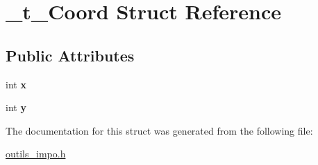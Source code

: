 \hypertarget{struct__t__Coord}{\section{\-\_\-t\-\_\-\-Coord Struct Reference}
\label{struct__t__Coord}
}
\subsection*{Public Attributes}
\begin{DoxyCompactItemize}
\item 
\hypertarget{struct__t__Coord_a593a81026d9ad7bec726736ce32c5660}{int {\bfseries x}}\label{struct__t__Coord_a593a81026d9ad7bec726736ce32c5660}

\item 
\hypertarget{struct__t__Coord_ae4e218fd7b05406f283e6dbbccffff35}{int {\bfseries y}}\label{struct__t__Coord_ae4e218fd7b05406f283e6dbbccffff35}

\end{DoxyCompactItemize}


The documentation for this struct was generated from the following file\-:\begin{DoxyCompactItemize}
\item 
\hyperlink{outils__impo_8h}{outils\-\_\-impo.\-h}\end{DoxyCompactItemize}
